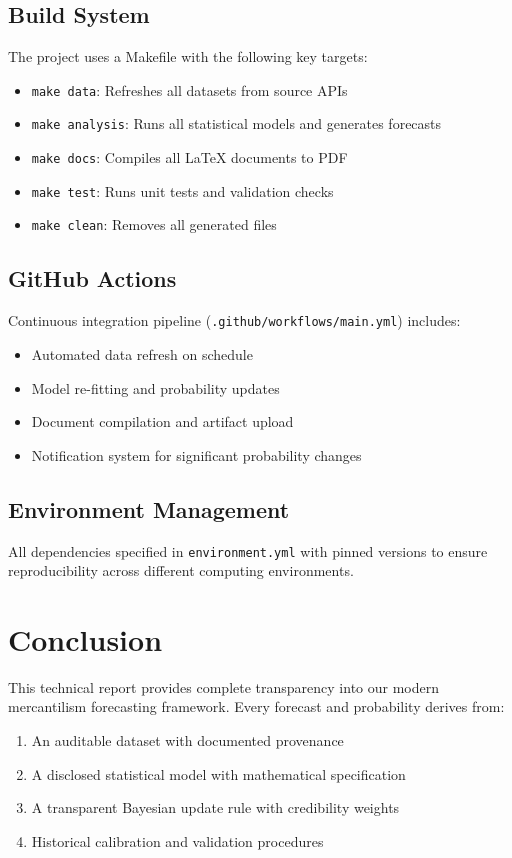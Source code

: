 \documentclass{article}
\begin{document}
\subsection{Build System}
The project uses a Makefile with the following key targets:
\begin{itemize}
\item \texttt{make data}: Refreshes all datasets from source APIs
\item \texttt{make analysis}: Runs all statistical models and generates forecasts
\item \texttt{make docs}: Compiles all LaTeX documents to PDF
\item \texttt{make test}: Runs unit tests and validation checks
\item \texttt{make clean}: Removes all generated files
\end{itemize}

\subsection{GitHub Actions}
Continuous integration pipeline (\texttt{.github/workflows/main.yml}) includes:
\begin{itemize}
\item Automated data refresh on schedule
\item Model re-fitting and probability updates
\item Document compilation and artifact upload
\item Notification system for significant probability changes
\end{itemize}

\subsection{Environment Management}
All dependencies specified in \texttt{environment.yml} with pinned versions to ensure reproducibility across different computing environments.

\section{Conclusion}
This technical report provides complete transparency into our modern mercantilism forecasting framework. Every forecast and probability derives from:
\begin{enumerate}
\item An auditable dataset with documented provenance
\item A disclosed statistical model with mathematical specification
\item A transparent Bayesian update rule with credibility weights
\item Historical calibration and validation procedures
\end{enumerate}
\end{document}
